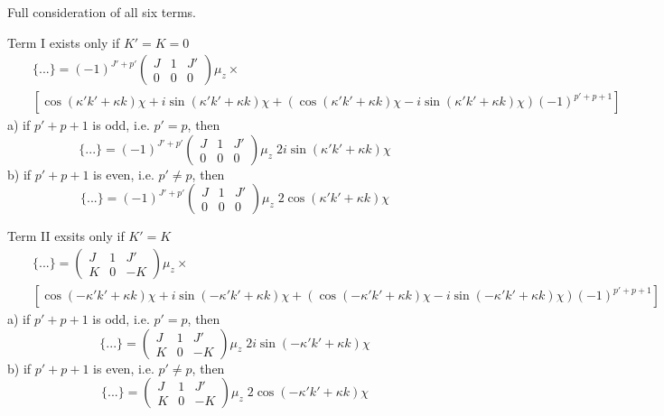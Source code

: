 Full consideration of all six terms.

Term I exists only if $K' = K = 0$
\begin{eqnarray}  \nonumber
&& \{...\} = (-1)^{J'+p'}
\left( \begin{array}{ccc} 
 J &  1 &  J' \\
 0 &  0 &  0   \end{array} \right)
\mu_z \times \\
&&
\left[ \cos ( \kappa' k' + \kappa k) \chi + i \sin ( \kappa' k' + \kappa k) \chi + 
\left( \cos ( \kappa' k' + \kappa k) \chi - i \sin ( \kappa' k' + \kappa k) \chi \right) (-1)^{p'+p+1} \right]
\end{eqnarray}
a) if $p'+p+1$ is odd, i.e. $p' = p$, then 
\begin{equation}
\{...\} = (-1)^{J'+p'}
\left( \begin{array}{ccc} 
 J &  1 &  J' \\
 0 &  0 &  0   \end{array} \right)
\mu_z \; 2 i \sin ( \kappa' k' + \kappa k) \chi
\end{equation}
b) if $p'+p+1$ is even, i.e. $p' \ne p$, then 
\begin{equation}
\{...\} = (-1)^{J'+p'}
\left( \begin{array}{ccc} 
 J &  1 &  J' \\
 0 &  0 &  0   \end{array} \right)
\mu_z \; 2 \cos ( \kappa' k' + \kappa k) \chi
\end{equation}


Term II exsits only if $K' = K$
\begin{eqnarray} \nonumber
&& \{...\} = 
\left( \begin{array}{ccc} 
 J &  1 &  J' \\
 K &  0 & -K   \end{array} \right)
\mu_z \times \\
&&
\left[ \cos ( -\kappa' k' + \kappa k) \chi + i \sin ( -\kappa' k' + \kappa k) \chi + 
\left( \cos ( -\kappa' k' + \kappa k) \chi - i \sin ( -\kappa' k' + \kappa k) \chi \right) (-1)^{p'+p+1} \right]
\end{eqnarray}
a) if $p'+p+1$ is odd, i.e. $p' = p$, then 
\begin{equation}
\{...\} =     
\left( \begin{array}{ccc} 
 J &  1 &  J' \\
 K &  0 & -K   \end{array} \right)
\mu_z \; 2 i \sin (-\kappa' k' + \kappa k) \chi
\end{equation}
b) if $p'+p+1$ is even, i.e. $p' \ne p$, then 
\begin{equation}
\{...\} =     
\left( \begin{array}{ccc} 
 J &  1 &  J' \\
 K &  0 & -K   \end{array} \right)
\mu_z \; 2 \cos (-\kappa' k' + \kappa k) \chi
\end{equation}


